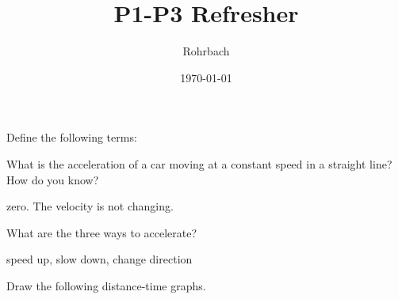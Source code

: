 \documentclass[10pt]{exam}
\title{P1-P3 Refresher}
\author{Rohrbach}
\date{\today}
\begin{document}
\maketitle

\begin{questions}


  \question
    Define the following terms: 

  \question
    What is the acceleration of a car moving at a constant speed in a straight line?  How do you know?
    \begin{solution}[\stretch{1}]
      zero.  The velocity is not changing.
    \end{solution}

  \question
    What are the three ways to accelerate?
    \begin{solution}[\stretch{1}]
      speed up, slow down, change direction
    \end{solution}

    \question
    Draw the following distance-time graphs.

    \newcommand{\empgraph}[1]{
      \par
      \begin{tikzpicture}
        \begin{axis}[empgraph]
        \ifprintanswers
          \addplot[soln] {#1};
        \fi
        \end{axis}
      \end{tikzpicture}
    }


\end{questions}
\end{document}
